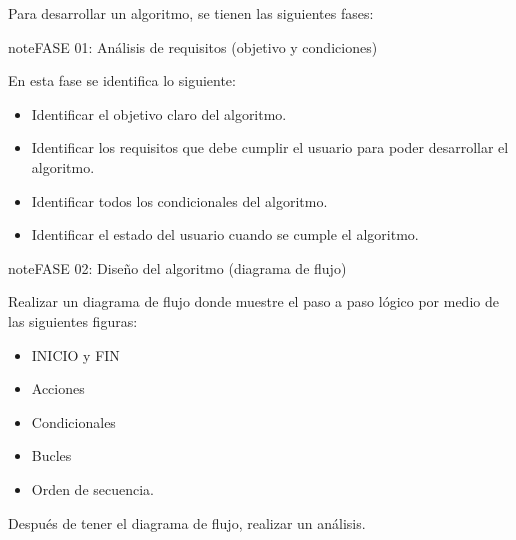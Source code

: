 \documentclass[letterpaper,10pt,spanish]{sphinxmanual}
\begin{document}
\sphinxAtStartPar
Para desarrollar un algoritmo, se tienen las siguientes fases:

\begin{sphinxadmonition}{note}{FASE 01:  Análisis de requisitos (objetivo y condiciones)}

\sphinxAtStartPar
En esta fase se identifica lo siguiente:
\begin{itemize}
\item {} 
\sphinxAtStartPar
{} Identificar el objetivo claro del algoritmo.

\item {} 
\sphinxAtStartPar
{} Identificar los requisitos que debe cumplir el usuario para poder desarrollar el algoritmo.

\item {} 
\sphinxAtStartPar
{} Identificar todos los condicionales del algoritmo.

\item {} 
\sphinxAtStartPar
{} Identificar el estado del usuario cuando se cumple el algoritmo.

\end{itemize}
\end{sphinxadmonition}

\begin{sphinxadmonition}{note}{FASE 02: Diseño del algoritmo (diagrama de flujo)}

\sphinxAtStartPar
Realizar un diagrama de flujo donde muestre el paso a paso lógico por medio de las siguientes figuras:
\begin{itemize}
\item {} 
\sphinxAtStartPar
{} INICIO y FIN

\item {} 
\sphinxAtStartPar
{} Acciones

\item {} 
\sphinxAtStartPar
{} Condicionales

\item {} 
\sphinxAtStartPar
{} Bucles

\item {} 
\sphinxAtStartPar
{} Orden de secuencia.

\end{itemize}

\sphinxAtStartPar
Después de tener el diagrama de flujo, realizar un análisis.
\end{sphinxadmonition}
\end{document}
